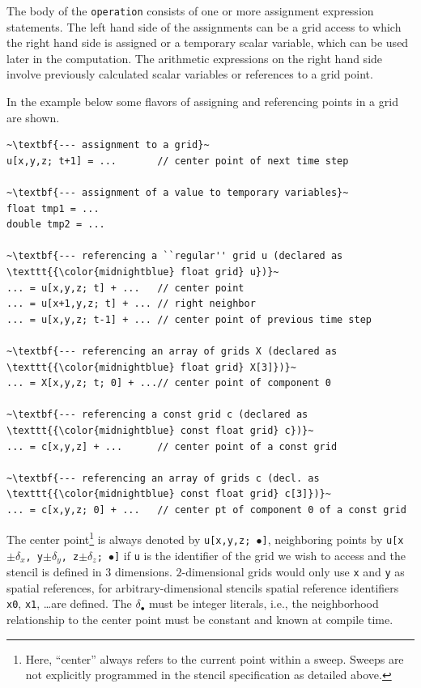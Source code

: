 The body of the \texttt{operation} consists of one or more assignment expression statements.
The left hand side of the assignments can be a grid access to which the right hand side is assigned
or a temporary scalar variable, which can be used later in the computation.
The arithmetic expressions on the right hand side involve previously calculated scalar variables or
references to a grid point.

In the example below some flavors of assigning and referencing points in a grid are shown.
\begin{lstlisting}[language=stencil]
~\textbf{--- assignment to a grid}~
u[x,y,z; t+1] = ...       // center point of next time step

~\textbf{--- assignment of a value to temporary variables}~
float tmp1 = ...
double tmp2 = ...

~\textbf{--- referencing a ``regular'' grid u (declared as \texttt{{\color{midnightblue} float grid} u})}~
... = u[x,y,z; t] + ...   // center point
... = u[x+1,y,z; t] + ... // right neighbor
... = u[x,y,z; t-1] + ... // center point of previous time step

~\textbf{--- referencing an array of grids X (declared as \texttt{{\color{midnightblue} float grid} X[3]})}~
... = X[x,y,z; t; 0] + ...// center point of component 0

~\textbf{--- referencing a const grid c (declared as \texttt{{\color{midnightblue} const float grid} c})}~
... = c[x,y,z] + ...      // center point of a const grid

~\textbf{--- referencing an array of grids c (decl. as \texttt{{\color{midnightblue} const float grid} c[3]})}~
... = c[x,y,z; 0] + ...   // center pt of component 0 of a const grid
\end{lstlisting}

The center point\footnote{Here, ``center'' always refers to the current point within a
sweep. Sweeps are not explicitly programmed in the stencil specification as detailed above.}
is always denoted by \texttt{u[x,y,z; $\bullet$]}, neighboring points by
\texttt{u[x$\pm\delta_x$, y$\pm\delta_y$, z$\pm\delta_z$; $\bullet$]}
if \texttt{u} is the identifier of the grid we wish to access and the stencil is defined in $3$
dimensions.
$2$-dimensional grids would only use \texttt{x} and \texttt{y} as spatial references,
for arbitrary-dimensional stencils spatial reference identifiers \texttt{x0}, \texttt{x1}, \dots are defined.
The $\delta_{\bullet}$ must be integer literals, i.e., the neighborhood relationship to the center point
must be constant and known at compile time.

